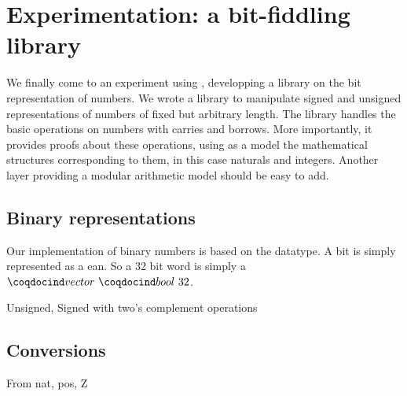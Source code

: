 \section{Experimentation: a bit-fiddling library}

We finally come to an experiment using \Equations, developping a library
on the bit representation of numbers. We wrote a library to 
manipulate signed and unsigned representations of numbers of fixed but
arbitrary length. The library handles the basic operations on
numbers with carries and borrows. More importantly, it provides proofs
about these operations, using as a model the mathematical structures
corresponding to them, in this case naturals and integers. Another layer
providing a modular arithmetic model should be easy to add.

\subsection{Binary representations}

Our implementation of binary numbers is based on the 
datatype. A bit is simply represented as a ean.
So a 32 bit word is simply a $\ind{vector}~\ind{bool}~32$.





Unsigned, Signed with two's complement operations

\subsection{Conversions}

From nat, pos, Z

